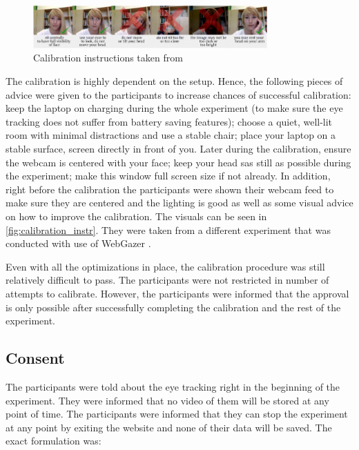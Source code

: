 \begin{figure}
    \centering
    \includegraphics[width=0.8\textwidth]{images/calibration_instr.png}
    \caption{Calibration instructions taken from \cite{Semmelmann_2018}}
    \label{fig:calibration_instr}
\end{figure}

The calibration is highly dependent on the setup. Hence, the following pieces of advice were given to the participants to increase chances of successful calibration: keep the laptop on charging during the whole experiment (to make sure the eye tracking does not suffer from battery saving features); choose a quiet, well-lit room with minimal distractions and use a stable chair; place your laptop on a stable surface, screen directly in front of you. Later during the calibration, ensure the webcam is centered with your face; keep your head sas still as possible during the experiment; make this window full screen size if not already. In addition, right before the calibration the participants were shown their webcam feed to make sure they are centered and the lighting is good as well as some visual advice on how to improve the calibration. The visuals can be seen in \autoref{fig:calibration_instr}. They were taken from a different experiment \cite{Semmelmann_2018} that was conducted with use of WebGazer \cite{webgazer}.

Even with all the optimizations in place, the calibration procedure was still relatively difficult to pass. The participants were not restricted in number of attempts to calibrate. However, the participants were informed that the approval is only possible after successfully completing the calibration and the rest of the experiment.

\subsection{Consent}
The participants were told about the eye tracking right in the beginning of the experiment. They were informed that no video of them will be stored at any point of time. The participants were informed that they can stop the experiment at any point by exiting the website and none of their data will be saved. The exact formulation was: 

